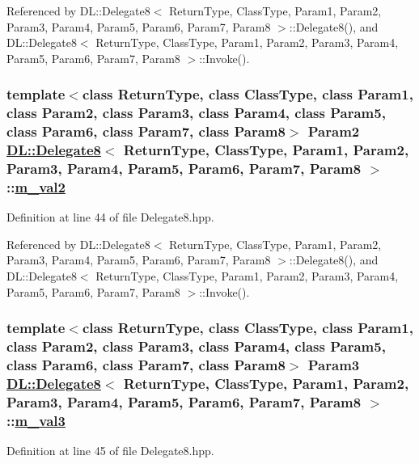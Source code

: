 Referenced by DL::Delegate8$<$ Return\-Type, Class\-Type, Param1, Param2, Param3, Param4, Param5, Param6, Param7, Param8 $>$::Delegate8(), and DL::Delegate8$<$ Return\-Type, Class\-Type, Param1, Param2, Param3, Param4, Param5, Param6, Param7, Param8 $>$::Invoke().\hypertarget{classDL_1_1Delegate8_r3}{
\subsubsection[m\_\-val2]{\setlength{\rightskip}{0pt plus 5cm}template$<$class Return\-Type, class Class\-Type, class Param1, class Param2, class Param3, class Param4, class Param5, class Param6, class Param7, class Param8$>$ Param2 \hyperlink{classDL_1_1Delegate8}{DL::Delegate8}$<$ Return\-Type, Class\-Type, Param1, Param2, Param3, Param4, Param5, Param6, Param7, Param8 $>$::\hyperlink{classDL_1_1Delegate8_r3}{m\_\-val2}}}
\label{classDL_1_1Delegate8_r3}




Definition at line 44 of file Delegate8.hpp.

Referenced by DL::Delegate8$<$ Return\-Type, Class\-Type, Param1, Param2, Param3, Param4, Param5, Param6, Param7, Param8 $>$::Delegate8(), and DL::Delegate8$<$ Return\-Type, Class\-Type, Param1, Param2, Param3, Param4, Param5, Param6, Param7, Param8 $>$::Invoke().\hypertarget{classDL_1_1Delegate8_r4}{
\subsubsection[m\_\-val3]{\setlength{\rightskip}{0pt plus 5cm}template$<$class Return\-Type, class Class\-Type, class Param1, class Param2, class Param3, class Param4, class Param5, class Param6, class Param7, class Param8$>$ Param3 \hyperlink{classDL_1_1Delegate8}{DL::Delegate8}$<$ Return\-Type, Class\-Type, Param1, Param2, Param3, Param4, Param5, Param6, Param7, Param8 $>$::\hyperlink{classDL_1_1Delegate8_r4}{m\_\-val3}}}
\label{classDL_1_1Delegate8_r4}




Definition at line 45 of file Delegate8.hpp.

